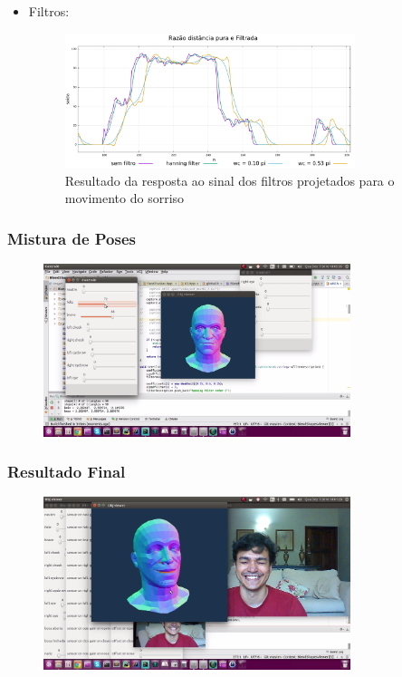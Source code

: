 \documentclass[brazil]{beamer}
\begin{document}
\begin{frame}
  \begin{itemize}
      \item Filtros:
	\begin{figure}
        \centering
        \includegraphics[width = 0.8\textwidth, keepaspectratio]{./img/filter-result-smile.pdf}
        \caption{Resultado da resposta ao sinal dos filtros projetados para o movimento do sorriso}
      \end{figure}
              
  \end{itemize} 
\end{frame}


\begin{frame}
\frametitle{Mistura de Poses}

	\begin{figure}
        \centering
        \includegraphics[width = 0.8\textwidth, keepaspectratio]{./img/blend-demo.png}
      \end{figure}
 
\end{frame}

\begin{frame}
\frametitle{Resultado Final} 

	\begin{figure}
        \centering
        \includegraphics[width = 0.8\textwidth, keepaspectratio]{./img/result-0.png}
      \end{figure}

\end{frame}
\end{document}
